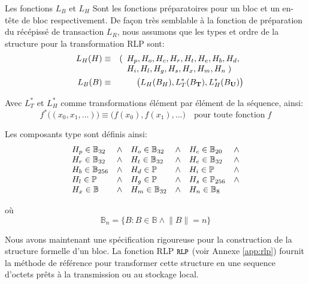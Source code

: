 \documentclass[9pt,oneside]{amsart}
\begin{document}
\begin{multicols}{2}
Les fonctions $L_B$ et $L_H$ Sont les fonctions préparatoires pour un bloc et un en-tête de bloc respectivement. De façon très semblable à la fonction de préparation du récépissé de transaction $L_R$, nous assumons que les types et ordre de la structure pour la transformation RLP sont:
\begin{eqnarray}
\quad L_H(H) & \equiv & (\begin{array}[t]{l}H_p, H_o, H_c, H_r, H_t, H_e, H_b, H_d,\\ H_i, H_l, H_g, H_s, H_x, H_m, H_n \; )\end{array} \\
\quad L_B(B) & \equiv & \big( L_H(B_H), L_T^*(B_\mathbf{T}), L_H^*(B_\mathbf{U}) \big)
\end{eqnarray}

Avec $L_T^*$ et $L_H^*$ comme transformations élément par élément de la séquence, ainsi:
\begin{equation}
f^*\big( (x_0, x_1, ...) \big) \equiv \big( f(x_0), f(x_1), ... \big) \quad \text{pour toute fonction} \; f
\end{equation}

Les composants type sont définis ainsi:
\begin{equation}
\begin{array}[t]{lclclcl}
H_p \in \mathbb{B}_{32} & \wedge & H_o \in \mathbb{B}_{32} & \wedge & H_c \in \mathbb{B}_{20} & \wedge \\
H_r \in \mathbb{B}_{32} & \wedge & H_t \in \mathbb{B}_{32} & \wedge & H_e \in \mathbb{B}_{32} & \wedge \\
H_b \in \mathbb{B}_{256} & \wedge & H_d \in \mathbb{P} & \wedge & H_i \in \mathbb{P} & \wedge \\
H_l \in \mathbb{P} & \wedge & H_g \in \mathbb{P} & \wedge & H_s \in \mathbb{P}_{256} & \wedge \\
H_x \in \mathbb{B} & \wedge & H_m \in \mathbb{B}_{32} & \wedge & H_n \in \mathbb{B}_{8}
\end{array}
\end{equation}

où
\begin{equation}
\mathbb{B}_n = \{ B: B \in \mathbb{B} \wedge \lVert B \rVert = n \}
\end{equation}

Nous avons maintenant une spécification rigoureuse pour la construction de la structure formelle d'un bloc. La fonction RLP $\texttt{\small RLP}$ (voir Annexe \ref{app:rlp}) fournit la méthode de référence pour transformer cette structure en une sequence d'octets prêts à la transmission ou au stockage local.


\end{multicols}
\end{document}
